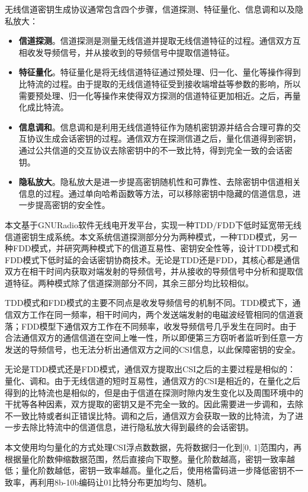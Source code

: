 \documentclass[master]{seuthesis} %
\begin{document}
\begin{Main}
无线信道密钥生成协议通常包含四个步骤，信道探测、特征量化、信息调和以及隐私放大：

\begin{itemize}
    \item \textbf{信道探测}。信道探测是测量无线信道并提取无线信道特征的过程。通信双方互相收发导频信号，并从接收到的导频信号中提取信道特征。
    \item \textbf{特征量化}。特征量化是将无线信道特征通过预处理、归一化、量化等操作得到比特流的过程。由于提取的无线信道特征受到接收端增益等参数的影响，所以需要预处理、归一化等操作来使得双方探测的信道特征更加相近。之后，再量化成比特流。
    \item \textbf{信息调和}。信息调和是利用无线信道特征作为随机密钥源并结合合理可靠的交互协议生成会话密钥的过程。通信双方在探测信道之后，量化信道得到密钥，通过公共信道的交互协议去除密钥中的不一致比特，得到完全一致的会话密钥\cite{cachin1997linking}。
    \item \textbf{隐私放大}。隐私放大是进一步提高密钥随机性和可靠性、去除密钥中信道相关信息的过程。通过单向哈希函数等方法，可以移除密钥中隐藏的信道信息，进一步提高密钥的安全性\cite{cachin1997linking}。
\end{itemize}

本文基于GNURadio软件无线电开发平台，实现一种TDD/FDD下低时延宽带无线信道密钥生成系统。本文系统信道探测部分分为两种模式，一种TDD模式，另一种FDD模式，并研究两种模式下的信道互易性、密钥安全性等，设计TDD模式和FDD模式下低时延的会话密钥协商技术。无论是TDD还是FDD，其核心都是通信双方在相干时间内获取对端发射的导频信号，并从接收的导频信号中分析和提取信道特征。两种模式除了信道探测部分不同，其余三部分均比较相似。

TDD模式和FDD模式的主要不同点是收发导频信号的机制不同。TDD模式下，通信双方工作在同一频率，相干时间内，两个发送端发射的电磁波经管相同的信道衰落；FDD模型下通信双方工作在不同频率，收发导频信号几乎发生在同时。由于合法通信双方的通信信道在空间上唯一性，所以即便第三方窃听者监听到任意一方发送的导频信号，也无法分析出通信双方之间的CSI信息，以此保障密钥的安全。

无论是TDD模式还是FDD模式，通信双方提取出CSI之后的主要过程是相似的：量化、调和。由于无线信道的短时互易性，通信双方的CSI是相近的，在量化之后得到的比特流也是相似的，但是由于信道在探测时隙内发生变化以及周围环境中的干扰等各种因素，双方提取的密钥又是不完全一致的。因此需要进一步调和，去除不一致比特或者纠正错误比特。调和之后，通信双方会获取一致的比特流，为了进一步去除比特流中的信道信息，进行隐私放大得到最终的会话密钥。

本文使用均匀量化的方式处理CSI浮点数数据，先将数据归一化到[0, 1]范围内，再根据量化阶数伸缩数据范围，然后直接向下取整。量化阶数越高，密钥一致率越低；量化阶数越低，密钥一致率越高。量化之后，使用格雷码进一步降低密钥不一致率，再利用8b-10b编码让01比特分布更加均匀、随机。


\end{Main}
\end{document}
